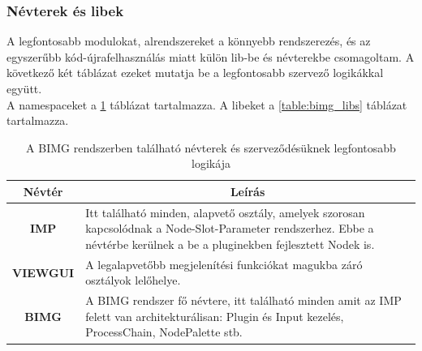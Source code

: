 \documentclass[a4paper,12pt,oneside]{report}
\begin{document}
\subsubsection{Névterek és libek}
A legfontosabb modulokat, alrendszereket a könnyebb rendszerezés, és az egyszerűbb kód-újrafelhasználás miatt külön lib-be és névterekbe csomagoltam. A következő két táblázat ezeket mutatja be a legfontosabb szervező logikákkal együtt. \\ A namespaceket a \ref{table:bimg_namespace} táblázat tartalmazza. A libeket a \ref{table:bimg_libs} táblázat tartalmazza. 
\begin{table}[h]
\begin{tabular}{p{1cm}|p{12cm}}

\toprule
\multicolumn{1}{c|}{\textbf{Névtér}} & \multicolumn{1}{|c}{\textbf{Leírás}} \\ \midrule
\multicolumn{1}{c|}{\textbf{IMP}}  & Itt található minden, alapvető osztály, amelyek szorosan kapcsolódnak a Node-Slot-Parameter rendszerhez. Ebbe a névtérbe kerülnek a be a pluginekben fejlesztett Nodek is.\\
\hline
\multicolumn{1}{c|}{\textbf{VIEWGUI}}  &  A legalapvetőbb megjelenítési funkciókat magukba záró osztályok lelőhelye.\\
\hline
\multicolumn{1}{c|}{\textbf{BIMG}}  & A BIMG rendszer fő névtere, itt található minden amit az IMP felett van architekturálisan: Plugin és Input kezelés, ProcessChain, NodePalette stb. \\
\hline

\end{tabular}
\caption{A BIMG rendszerben található névterek és szerveződésüknek legfontosabb logikája }
\label{table:bimg_namespace}
\end{table}
\end{document}
